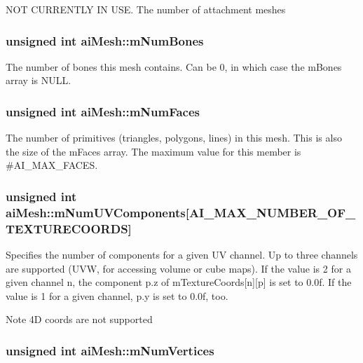 N\-O\-T C\-U\-R\-R\-E\-N\-T\-L\-Y I\-N U\-S\-E. The number of attachment meshes \hypertarget{structai_mesh_a0f9d5425b6300e32a842a94f943fd79e}{
\subsubsection[{m\-Num\-Bones}]{\setlength{\rightskip}{0pt plus 5cm}unsigned int ai\-Mesh\-::m\-Num\-Bones}}\label{structai_mesh_a0f9d5425b6300e32a842a94f943fd79e}
The number of bones this mesh contains. Can be 0, in which case the m\-Bones array is N\-U\-L\-L. \hypertarget{structai_mesh_aeed22ee6963b79548f3877b3c905518e}{
\subsubsection[{m\-Num\-Faces}]{\setlength{\rightskip}{0pt plus 5cm}unsigned int ai\-Mesh\-::m\-Num\-Faces}}\label{structai_mesh_aeed22ee6963b79548f3877b3c905518e}
The number of primitives (triangles, polygons, lines) in this mesh. This is also the size of the m\-Faces array. The maximum value for this member is \#\-A\-I\-\_\-\-M\-A\-X\-\_\-\-F\-A\-C\-E\-S. \hypertarget{structai_mesh_a635c631a6e66d32989d6b25b2a892d86}{
\subsubsection[{m\-Num\-U\-V\-Components}]{\setlength{\rightskip}{0pt plus 5cm}unsigned int ai\-Mesh\-::m\-Num\-U\-V\-Components\mbox{[}A\-I\-\_\-\-M\-A\-X\-\_\-\-N\-U\-M\-B\-E\-R\-\_\-\-O\-F\-\_\-\-T\-E\-X\-T\-U\-R\-E\-C\-O\-O\-R\-D\-S\mbox{]}}}\label{structai_mesh_a635c631a6e66d32989d6b25b2a892d86}
Specifies the number of components for a given U\-V channel. Up to three channels are supported (U\-V\-W, for accessing volume or cube maps). If the value is 2 for a given channel n, the component p.\-z of m\-Texture\-Coords\mbox{[}n\mbox{]}\mbox{[}p\mbox{]} is set to 0.\-0f. If the value is 1 for a given channel, p.\-y is set to 0.\-0f, too. \begin{DoxyNote}{Note}
4\-D coords are not supported 
\end{DoxyNote}
\hypertarget{structai_mesh_ab34b7b5941e6636f1c08f615cbb072ef}{
\subsubsection[{m\-Num\-Vertices}]{\setlength{\rightskip}{0pt plus 5cm}unsigned int ai\-Mesh\-::m\-Num\-Vertices}}\label{structai_mesh_ab34b7b5941e6636f1c08f615cbb072ef}
